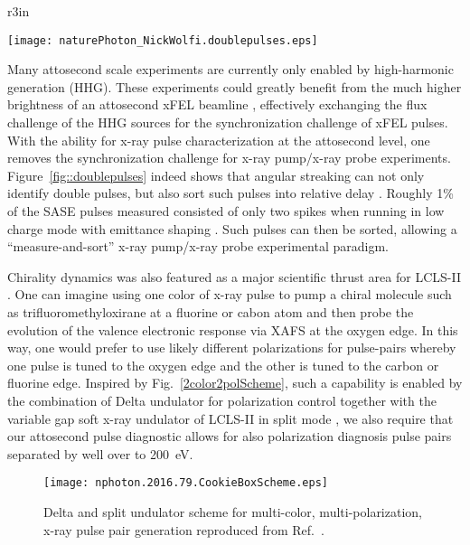 \begin{wrapfigure}[9]{r}{3in}
\vspace{-3\baselineskip}
\centerline{\texttt{[image: naturePhoton\_NickWolfi.doublepulses.eps]}}
\vspace{-0.5\baselineskip}
\caption{\label{fig::doublepulses}Reproduced from Ref.~\cite{Nick2018}.
}
\end{wrapfigure}
Many attosecond scale experiments are currently only enabled by high-harmonic generation (HHG)\cite{Lewenstein1994,Hentschel2001,Chen2014,Biegert2014,Schmidt2016,Biegert2016,WornerSci2017,Zenghu2017}.
These experiments could greatly benefit from the much higher brightness of an attosecond xFEL beamline \cite{Ding2009,Xiang2009,xLEAP}, effectively exchanging the flux challenge of the HHG sources for the synchronization challenge of xFEL pulses.
With the ability for x-ray pulse characterization at the attosecond level, one removes the synchronization challenge for x-ray pump/x-ray probe experiments.
Figure~\ref{fig::doublepulses} indeed shows that angular streaking can not only identify double pulses, but also sort such pulses into relative delay \cite{Nick2018}.
Roughly 1\% of the SASE pulses measured consisted of only two spikes when running in low charge mode with emittance shaping \cite{EmmaFoil}.
Such pulses can then be sorted, allowing a ``measure-and-sort'' x-ray pump/x-ray probe experimental paradigm.

Chirality dynamics was also featured as a major scientific thrust area for LCLS-II \cite{lcls2_opportunities}.
One can imagine using one color of x-ray pulse to pump a chiral molecule such as trifluoromethyloxirane \cite{Ilchen2017} at a fluorine or cabon atom and then probe the evolution of the valence electronic response via XAFS at the oxygen edge.
In this way, one would prefer to use likely different polarizations \cite{Lutman2016,Dichroism2016} for pulse-pairs whereby one pulse is tuned to the oxygen edge and the other is tuned to the carbon or fluorine edge.
Inspired by Fig.~\ref{2color2polScheme}, such a capability is enabled by the combination of Delta undulator for polarization control together with the variable gap soft x-ray undulator of LCLS-II in split mode \cite{Lutman13_twocolor,LutmanFreshSlice2016}, we also require that our attosecond pulse diagnostic allows for also polarization diagnosis pulse pairs separated by well over to 200~eV.

\begin{figure}[b]
\centerline{\texttt{[image: nphoton.2016.79.CookieBoxScheme.eps]}}
\caption{\label{fig::2color2polScheme} Delta and split undulator scheme for multi-color, multi-polarization, x-ray pulse pair generation reproduced from Ref.~\cite{Lutman2016}. }
\end{figure}

